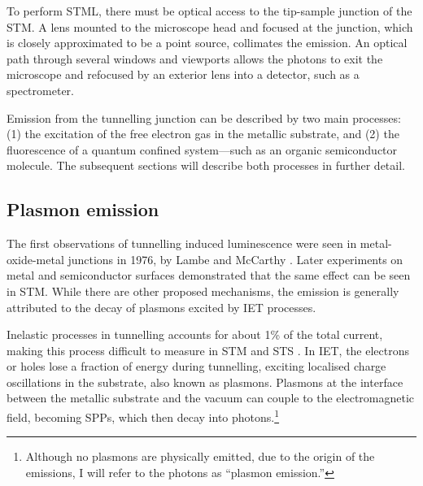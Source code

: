 To perform \ac{STML}, there must be optical access to the tip-sample junction of the \ac{STM}. A lens mounted to the microscope head and focused at the junction, which is closely approximated to be a point source, collimates the emission. An optical path through several windows and viewports allows the photons to exit the microscope and refocused by an exterior lens into a detector, such as a spectrometer. 


Emission from the tunnelling junction can be described by two main processes: (1) the excitation of the free electron gas in the metallic substrate, and (2) the fluorescence of a quantum confined system---such as an organic semiconductor molecule. The subsequent sections will describe both processes in further detail. 


\subsection{Plasmon emission}

The first observations of tunnelling induced luminescence were seen in metal-oxide-metal junctions in 1976, by Lambe and McCarthy \citep{lambe1976light}. Later experiments on metal and semiconductor surfaces demonstrated that the same effect can be seen in \ac{STM}. While there are other proposed mechanisms, the emission is generally attributed to the decay of plasmons excited by \acf{IET} processes.

Inelastic processes in tunnelling accounts for about 1\% of the total current, making this process difficult to measure in \ac{STM} and \ac{STS} \citep{novotny2012principles}. In \ac{IET}, the electrons or holes lose a fraction of energy during tunnelling, exciting localised charge oscillations in the substrate, also known as plasmons. Plasmons at the interface between the metallic substrate and the vacuum can couple to the electromagnetic field, becoming \acp{SPP}, which then decay into photons.\footnote{Although no plasmons are physically emitted, due to the origin of the emissions, I will refer to the photons as ``plasmon emission.''} 

